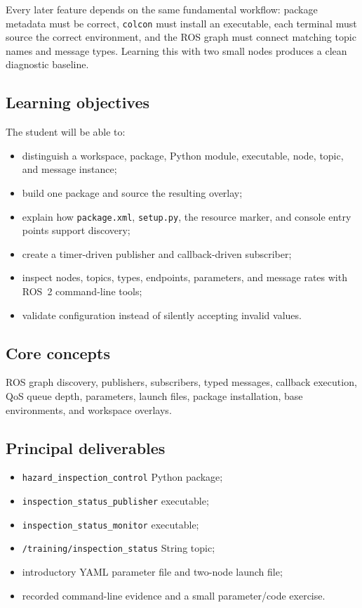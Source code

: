 \documentclass[11pt]{article}
\begin{document}
Every later feature depends on the same fundamental workflow: package metadata
must be correct, \texttt{colcon} must install an executable, each terminal must
source the correct environment, and the ROS graph must connect matching topic
names and message types. Learning this with two small nodes produces a clean
diagnostic baseline.

\subsection{Learning objectives}

The student will be able to:

\begin{itemize}
  \item distinguish a workspace, package, Python module, executable, node,
        topic, and message instance;
  \item build one package and source the resulting overlay;
  \item explain how \texttt{package.xml}, \texttt{setup.py}, the resource
        marker, and console entry points support discovery;
  \item create a timer-driven publisher and callback-driven subscriber;
  \item inspect nodes, topics, types, endpoints, parameters, and message rates
        with ROS~2 command-line tools;
  \item validate configuration instead of silently accepting invalid values.
\end{itemize}

\subsection{Core concepts}

ROS graph discovery, publishers, subscribers, typed messages, callback
execution, QoS queue depth, parameters, launch files, package installation,
base environments, and workspace overlays.

\subsection{Principal deliverables}

\begin{itemize}
  \item \texttt{hazard\_inspection\_control} Python package;
  \item \texttt{inspection\_status\_publisher} executable;
  \item \texttt{inspection\_status\_monitor} executable;
  \item \texttt{/training/inspection\_status} String topic;
  \item introductory YAML parameter file and two-node launch file;
  \item recorded command-line evidence and a small parameter/code exercise.
\end{itemize}
\end{document}
